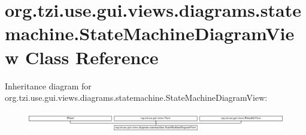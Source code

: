 \hypertarget{classorg_1_1tzi_1_1use_1_1gui_1_1views_1_1diagrams_1_1statemachine_1_1_state_machine_diagram_view}{\section{org.\-tzi.\-use.\-gui.\-views.\-diagrams.\-statemachine.\-State\-Machine\-Diagram\-View Class Reference}
\label{classorg_1_1tzi_1_1use_1_1gui_1_1views_1_1diagrams_1_1statemachine_1_1_state_machine_diagram_view}
}
Inheritance diagram for org.\-tzi.\-use.\-gui.\-views.\-diagrams.\-statemachine.\-State\-Machine\-Diagram\-View\-:\begin{figure}[H]
\begin{center}
\leavevmode
\includegraphics[height=0.880503cm]{classorg_1_1tzi_1_1use_1_1gui_1_1views_1_1diagrams_1_1statemachine_1_1_state_machine_diagram_view}
\end{center}
\end{figure}
